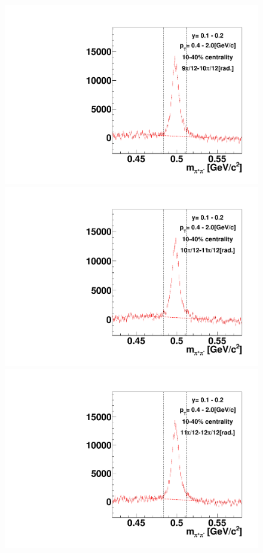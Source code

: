 \begin{figure}[h]
\includegraphics[width=0.14\linewidth]{chapterX/fig/ks_v1_sig/kf_ptslice0_cent1_ks_flow_phi10_rap3.pdf}
\includegraphics[width=0.14\linewidth]{chapterX/fig/ks_v1_sig/kf_ptslice0_cent1_ks_flow_phi11_rap3.pdf}
\includegraphics[width=0.14\linewidth]{chapterX/fig/ks_v1_sig/kf_ptslice0_cent1_ks_flow_phi12_rap3.pdf}


\end{figure}
